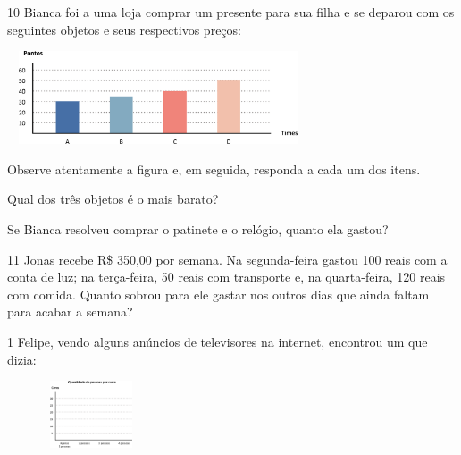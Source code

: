 \begin{multicols}{2}

\num{10} Bianca foi a uma loja comprar um presente para sua filha e se deparou
com os seguintes objetos e seus respectivos preços:


\includegraphics[width=3.51697in,height=1.08343in]{media/image80.png}

Observe atentamente a figura e, em seguida, responda a cada um dos itens.

\begin{escolha}
\item Qual dos três objetos é o mais barato?


\item Se Bianca resolveu comprar o patinete e o relógio, quanto ela gastou?

\end{escolha}

\num{11} Jonas recebe R\$ 350,00 por semana. Na segunda-feira gastou 100 reais
com a conta de luz; na terça-feira, 50 reais com transporte e, na quarta-feira, 120 reais com comida. Quanto sobrou para ele gastar nos outros
dias que ainda faltam para acabar a semana?



\num{1} Felipe, vendo alguns anúncios de televisores na internet, encontrou um que dizia:


\includegraphics[width=1.95850in,height=0.77507in]{media/image81.png}


\end{multicols}

